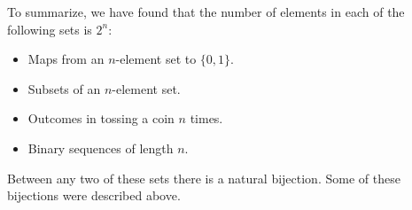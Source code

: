 

\setcounter{section}{2}
\setcounter{subsection}{2}
\setcounter{dfn}{7}


To summarize, we have found that the number of elements in each of the following sets is $2^n$:
\begin{itemize}
\item
Maps from an $n$-element set to $\{0,1\}$.
\item
Subsets of an $n$-element set.
\item
Outcomes in tossing a coin $n$ times.
\item
Binary sequences of length $n$.
\end{itemize}

Between any two of these sets there is a natural bijection.
Some of these bijections were described above.




